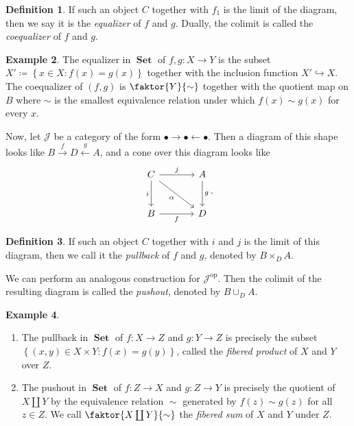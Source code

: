 \documentclass[10pt,letterpaper,cm]{nupset}
\theoremstyle{definition}
\newtheorem{definition}{Definition}[section]
\newtheorem{exmp}[definition]{Example}
\theoremstyle{theorem}
\theoremstyle{remark}
\newcommand{\1}{\mathbf{1}}
\renewcommand{\j}{\mathscr{J}}
\newcommand{\0}{\vec 0}
\DeclareMathOperator{\op}{op}
\DeclareMathOperator{\set}{\mathbf{Set}}
\begin{document}
\begin{definition}
If such an object $C$ together with $f_1$ is the limit of the diagram, then we say it is the \textit{equalizer} of $f$ and $g$. Dually, the colimit is called the \textit{coequalizer} of $f$ and $g$.
\end{definition}

\begin{exmp}\label{set}
The equalizer in $\set$ of $f, g: X \to Y$ is the subset $X'\coloneqq \left\{x \in X : f(x) = g(x)\right\}$ together with the inclusion function $X' \hookrightarrow X$. The coequalizer of $\left(f, g\right)$ is $\faktor{Y}{\sim}$ together with the quotient map on $B$ where $\sim$ is the smallest equivalence relation under which $f(x) \sim g(x)$ for every $x$.
\end{exmp}

\smallskip

Now, let $\j$ be a category of the form $\bullet \rightarrow \bullet \leftarrow \bullet$. Then a diagram of this shape looks like $B \overset{f}{\longrightarrow} D \overset{g}{\longleftarrow} A$, and a cone over this diagram looks like 
\[
\begin{tikzcd}[row sep=large, column sep=large]
C \arrow[to=Z, "i ", swap] \arrow[to=2-2, dr, "\alpha", swap]
& A \arrow[to=2-2, "g "] \\
|[alias=Z]| B  \arrow[to=2-2, "f"'] 
& D
\arrow[from=ul, to=1-2, "j "]
\end{tikzcd}.
\]

\begin{definition}
If such an object $C$ together with $i$ and $j$ is the limit of this diagram, then we call it the \textit{pullback} of $f$ and $g$, denoted by $B \times_{D} A$.
\end{definition}


We can perform an analogous construction for $\j^{\op}$. Then the colimit of the resulting diagram is called the \textit{pushout}, denoted by $B \cup_{D} A$.


\begin{exmp} $ $
\begin{enumerate}
\item The pullback in $\set$ of $f: X \to Z$ and $g: Y \to Z$ is precisely the subset $\left\{\left(x,y\right) \in X \times Y : f(x) = g(y)\right\}$, called the \textit{fibered product} of $X$ and $Y$ over $Z$.
\item The pushout in $\set$ of $f: Z \to X$ and $g: Z \to Y$  is precisely the quotient of $X \coprod Y$ by the equivalence relation ${}\sim{}$ generated by $f(z) \sim g(z)$ for all $z\in Z$. We call $\faktor{X \coprod Y}{\sim}$  the \textit{fibered sum} of $X$ and $Y$ under $Z$.
\end{enumerate}
\end{exmp}
\end{document}

